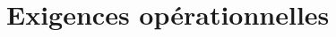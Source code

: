 \documentclass[a4paper,11pt,french]{article}
\begin{document}

\section{Exigences opérationnelles}

\end{document}
